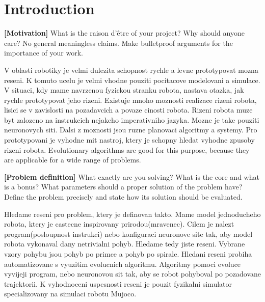 \documentclass{ExcelAtFIT}
\affiliation{*%
  \href{mailto:herout@fit.vutbr.cz}{herout@fit.vutbr.cz},
  \textit{Faculty of Information Technology, Brno University of Technology}}
\begin{document}
\startdocument



\section{Introduction}

\textbf{[Motivation]} What is the raison d'\^{e}tre of your project? Why should anyone care? No general meaningless claims. Make bulletproof arguments for the importance of your work.

V oblasti robotiky je velmi dulezita schopnost rychle a levne prototypovat mozna reseni.
K tomuto ucelu je velmi vhodne pouziti pocitacove modelovani a simulace.
V situaci, kdy mame navrzenou fyzickou stranku robota, nastava otazka, jak rychle prototypovat jeho rizeni.
Existuje mnoho moznosti realizace rizeni robota, lisici se v zavislosti na pozadavcich a povaze cinosti robota.
Rizeni robota muze byt zalozeno na instrukcich nejakeho imperativniho jazyka.
Mozne je take  pouziti neuronovych siti.
Dalsi z moznosti jsou ruzne planovaci algoritmy a systemy. 
Pro prototypovani je vyhodne mit nastroj, ktery je schopny hledat vyhodne zpusoby rizeni robota.
Evolutionary algorithms are good for this purpose, because they are applicable for a wide range of problems.~\cite{Eiben2015}

\textbf{[Problem definition]} What exactly are you solving? What is the core and what is a bonus? What parameters should a proper solution of the problem have? Define the problem precisely and state how its solution should be evaluated.

Hledame reseni pro problem, ktery je definovan takto.
Mame model jednoducheho robota, ktery je castecne inspirovany prirodou(mravenec). 
Cilem je nalezt program(posloupnost instrukci) nebo konfiguraci neuronove site tak, aby model robota vykonaval dany netrivialni pohyb.
Hledame tedy jiste reseni.
Vybrane vzory pohybu jsou pohyb po primce a pohyb po spirale.
Hledani reseni probiha automatizovane s vyuzitim evolucnich algoritmu.
Algoritmy pomoci evoluce vyvijeji program, nebo neuronovou sit tak, aby se robot pohyboval po pozadovane trajektorii.
K vyhodnoceni uspesnosti reseni je pouzit fyzikalni simulator specializovany na simulaci robotu Mujoco\cite{Todorov2012}.
\end{document}
